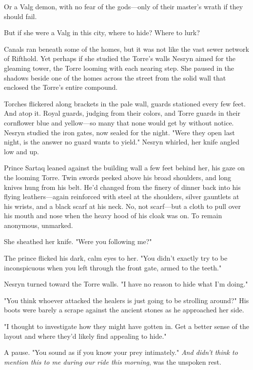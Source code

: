 Or a Valg demon, with no fear of the gods---only of their master's wrath if they should fail.

But if she were a Valg in this city, where to hide?
Where to lurk?

Canals ran beneath some of the homes, but it was not like the vast sewer network of Rifthold.
Yet perhaps if she studied the Torre's walls 
Nesryn aimed for the gleaming tower, the Torre looming with each nearing step.
She paused in the shadows beside one of the homes across the street from the solid wall that enclosed the Torre's entire compound.

Torches flickered along brackets in the pale wall, guards stationed every few feet.
And atop it.
Royal guards, judging from their colors, and Torre guards in their cornflower blue and yellow---so many that none would get by without notice.
Nesryn studied the iron gates, now sealed for the night.
"Were they open last night, is the answer no guard wants to yield."
Nesryn whirled, her knife angled low and up.

Prince Sartaq leaned against the building wall a few feet behind her, his gaze on the looming Torre.
Twin swords peeked above his broad shoulders, and long knives hung from his belt.
He'd changed from the finery of dinner back into his flying leathers---again reinforced with steel at the shoulders, silver gauntlets at his wrists, and a black scarf at his neck.
No, not scarf---but a cloth to pull over his mouth and nose when the heavy hood of his cloak was on.
To remain anonymous, unmarked.

She sheathed her knife.
"Were you following me?"

The prince flicked his dark, calm eyes to her.
"You didn't exactly try to be inconspicuous when you left through the front gate, armed to the teeth."

Nesryn turned toward the Torre walls.
"I have no reason to hide what I'm doing."

"You think whoever attacked the healers is just going to be strolling around?"
His boots were barely a scrape against the ancient stones as he approached her side.

"I thought to investigate how they might have gotten in.
Get a better sense of the layout and where they'd likely find appealing to hide."

A pause.
"You sound as if you know your prey intimately."
\emph{And didn't think to mention this to me during our ride this morning}, was the unspoken rest.

